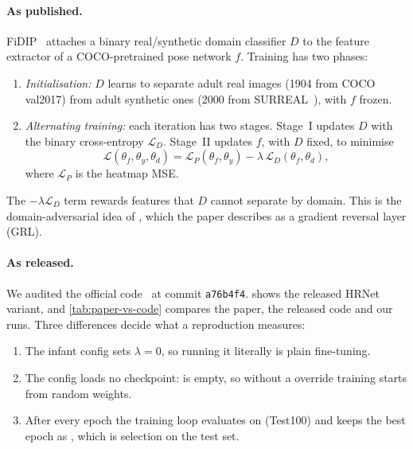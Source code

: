 \paragraph{As published.} FiDIP~\citep{huang2021fidip} attaches a binary real/synthetic domain classifier $D$ to the feature extractor of a COCO-pretrained pose network $f$. Training has two phases:
\begin{enumerate}[leftmargin=*]
  \item \emph{Initialisation:} $D$ learns to separate adult real images (1904 from COCO val2017) from adult synthetic ones (2000 from SURREAL~\citep{varol2017surreal}), with $f$ frozen.
  \item \emph{Alternating training:} each iteration has two stages. Stage~I updates $D$ with the binary cross-entropy $\mathcal{L}_D$. Stage~II updates $f$, with $D$ fixed, to minimise
\begin{equation}
  \mathcal{L}(\theta_f,\theta_y,\theta_d)=\mathcal{L}_P(\theta_f,\theta_y)-\lambda\,\mathcal{L}_D(\theta_f,\theta_d),
  \label{eq:fidip}
\end{equation}
where $\mathcal{L}_P$ is the heatmap MSE.
\end{enumerate}
The $-\lambda\mathcal{L}_D$ term rewards features that $D$ cannot separate by domain. This is the domain-adversarial idea of \citet{ganin2015unsupervised,ganin2016dann}, which the paper describes as a gradient reversal layer (GRL).

\paragraph{As released.} We audited the official code~\citep{fidipcode} at commit \texttt{a76b4f4}.  shows the released HRNet variant, and \cref{tab:paper-vs-code} compares the paper, the released code and our runs. Three differences decide what a reproduction measures:
\begin{enumerate}[label=(\roman*), leftmargin=*]
  \item The infant config sets $\lambda=0$, so running it literally is plain fine-tuning.
  \item The config loads no checkpoint:  is empty, so without a  override training starts from random weights.
  \item After every epoch the training loop evaluates on  (Test100) and keeps the best epoch as , which is selection on the test set.
\end{enumerate}

